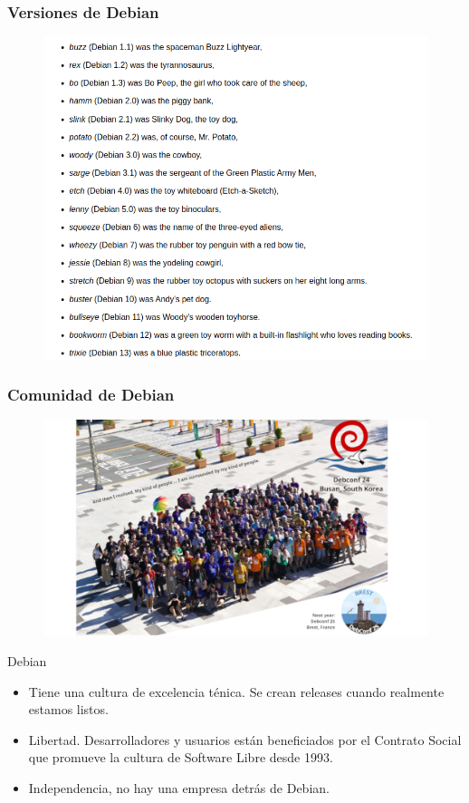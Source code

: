\documentclass{beamer}
\begin{document}
\begin{frame}
  \frametitle{Versiones de Debian}
	\begin{figure}
		\centering
		\includegraphics[width=0.7\linewidth]{images/versions.png}
		\label{fig:versiones de Debian}
	\end{figure}
\end{frame}
\begin{frame}
  \frametitle{Comunidad de Debian}
	\begin{figure}
		\centering
		\includegraphics[width=0.7\linewidth]{images/debconf.png}
		\label{fig:comunidad de Debian}
	\end{figure}
\end{frame}

\begin{frame}{Debian}
  \begin{itemize}
    \item Tiene una cultura de excelencia ténica. Se crean releases cuando realmente estamos listos.
    \item Libertad. Desarrolladores y usuarios están beneficiados por el Contrato Social que promueve la cultura de Software Libre desde 1993.
    \item Independencia, no hay una empresa detrás de Debian.
  \end{itemize}
\end{frame}
\end{document}
